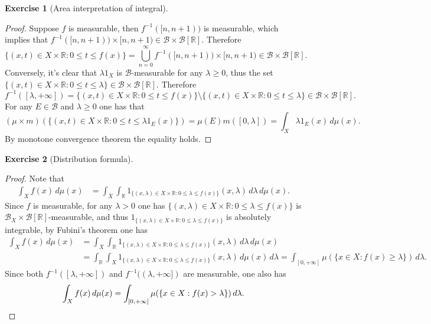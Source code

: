 \documentclass[a4paper]{article}
\newtheorem{ex}{Exercise}[subsection]
\begin{document}
\begin{ex}[Area interpretation of integral]\end{ex}\begin{proof}
Suppose $f$ is measurable, then $f^{-1}([n, n + 1))$ is measurable, which implies that $f^{-1}([n, n + 1)) \times [n, n + 1) 
\in \mathcal{B} \times \mathcal{B}[\mathbb{R}]$. Therefore $$
\{(x, t) \in X \times \mathbb{R} : 0 \leq t \leq f(x)\} = \bigcup_{n = 0}^\infty f^{-1}([n, n + 1)) \times [n, n + 1)
\in \mathcal{B} \times \mathcal{B}[\mathbb{R}].
$$Conversely, it's clear that $\lambda 1_X$ is $\mathcal{B}$-measurable for any $\lambda \geq 0$, thus the set 
$\{(x, t) \in X \times \mathbb{R} : 0 \leq t \leq \lambda\} \in \mathcal{B} \times \mathcal{B}[\mathbb{R}]$.
Therefore $$
f^{-1}([\lambda, +\infty]) = \{(x, t) \in X \times \mathbb{R} : 0 \leq t \leq f(x)\} \setminus 
\{(x, t) \in X \times \mathbb{R} : 0 \leq t \leq \lambda\} \in \mathcal{B} \times \mathcal{B}[\mathbb{R}].
$$For any $E \in \mathcal{B}$ and $\lambda \geq 0$ one has that $$
(\mu \times m)(\{(x, t) \in X \times \mathbb{R} : 0 \leq t \leq \lambda 1_E(x)\}) = \mu(E)m([0, \lambda]) = 
\int_X \lambda 1_E(x)\,d\mu(x).
$$By monotone convergence theorem the equality holds.
\end{proof}

\begin{ex}[Distribution formula]\end{ex}\begin{proof}
Note that\begin{align*}
\int_X f(x)\,d\mu(x) &= \int_X\int_\mathbb{R} 1_{\{(x, \lambda) \in X \times \mathbb{R} : 0 \leq \lambda 
\leq f(x)\}}(x, \lambda)\,d\lambda\,d\mu(x).
\end{align*}
Since $f$ is measurable, for any $\lambda > 0$ one has $\{(x, \lambda) \in X \times \mathbb{R}: 0 \leq \lambda \leq f(x)\}$ is 
$\mathcal{B}_X \times \mathcal{B}[\mathbb{R}]$-measurable, and thus 
$1_{\{(x, \lambda) \in X \times \mathbb{R}: 0 \leq \lambda \leq f(x)\}}$ is absolutely integrable, by Fubini's theorem
one has \begin{align*}
    \int_X f(x)\,d\mu(x) &= \int_X\int_\mathbb{R} 1_{\{(x, \lambda) \in X \times \mathbb{R} : 0 \leq \lambda 
    \leq f(x)\}}(x, \lambda)\,d\lambda\,d\mu(x)\\
    &= \int_\mathbb{R}\int_X 1_{\{(x, \lambda) \in X \times \mathbb{R} : 0 \leq \lambda \leq f(x)\}}(x, \lambda)\,d\mu(x)\,d\lambda
    = \int_{[0, +\infty]} \mu(\{x \in X : f(x) \geq \lambda\})\,d\lambda.
\end{align*}
Since both $f^{-1}([\lambda, +\infty])$ and $f^{-1}((\lambda, +\infty])$ are measurable, one also has \[
\int_X f(x)\,d\mu(x) = \int_{[0, +\infty]} \mu(\{x \in X : f(x) > \lambda\})\,d\lambda.\qedhere
\]
\end{proof}
\end{document}
